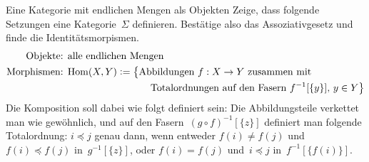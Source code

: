 \documentclass{uebblatt}
\begin{document}
\begin{aufgabe}{Eine Kategorie mit endlichen Mengen als Objekten}
Zeige, dass folgende Setzungen eine Kategorie~$\Sigma$ definieren. Bestätige
also das Assoziativgesetz und finde die Identitätsmorpismen.
\begin{align*}
  \text{Objekte: } & \text{alle endlichen Mengen} \\
  \text{Morphismen: } &
    \mathrm{Hom}(X,Y) \vcentcolon= \bigl\{
      \text{Abbildungen~$f : X \to Y$ zusammen mit} \\
    & \qquad\qquad\qquad\qquad \text{
      Totalordnungen auf den Fasern~$f^{-1}[\{y\}]$, $y \in Y$} \bigr\}
\end{align*}
Die Komposition soll dabei wie folgt definiert sein: Die Abbildungsteile
verkettet man wie gewöhnlich, und auf den Fasern~$(g \circ f)^{-1}[\{z\}]$
definiert man folgende Totalordnung: $i \preceq j$ genau dann, wenn entweder
$f(i) \neq f(j)$ und~$f(i) \preceq f(j)$ in~$g^{-1}[\{z\}]$, oder $f(i) =
f(j)$ und~$i \preceq j$ in~$f^{-1}[\{f(i)\}]$.
\end{aufgabe}
\end{document}
